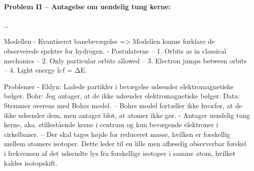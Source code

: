 \paragraph{Problem II -- Antagelse om uendelig tung kerne:} \ldots





Modellen
- Kvantiseret banebevægelse => Modellen kunne forklare de observerede spektre for hydrogen.
- Postulaterne
-- 1. Orbits as in classical mechanics
-- 2. Only particular orbits allowed
-- 3. Electron jumps between orbits
-- 4. Light energy h∙f = ΔE.

Problemer
- Eldyn: Ladede partikler i bevægelse udsender elektromagnetiske bølger. Bohr: Jeg antager, at de ikke udsender elektromagnetiske bølger. Data: Stemmer overens med Bohrs model.
-- Bohrs model fortæller ikke hvorfor, at de ikke udsender dem, men antager blot, at atomer ikke gør.
- Antager uendelig tung kerne, aka. stillestående kerne i centrum og kun bevægende elektroner i cirkelbaner.
-- Der skal tages højde for reduceret masse, hvilken er forskellig mellem atomers isotoper. Dette leder til en lille men aflæselig observerbar forskel i frekvensen af det udsendte lys fra forskellige isotoper i samme atom, hvilket kaldes isotopskift.